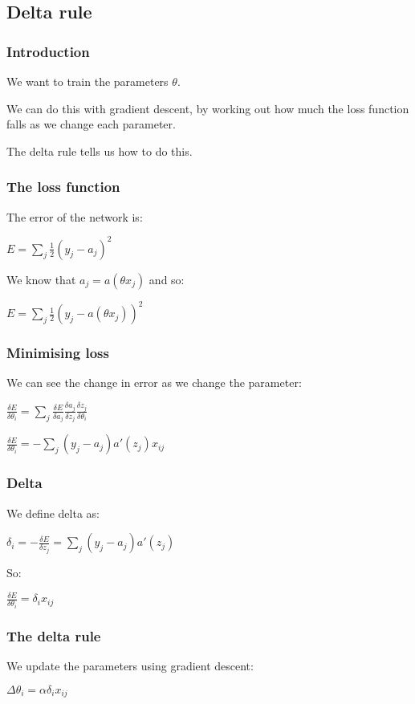 
\subsection{Delta rule}

\subsubsection{Introduction}

We want to train the parameters \(\theta \).

We can do this with gradient descent, by working out how much the loss function falls as we change each parameter.

The delta rule tells us how to do this.

\subsubsection{The loss function}

The error of the network is:

\(E=\sum_j\frac{1}{2}(y_j-a_j)^2\)

We know that \(a_j=a(\theta x_j)\) and so:

\(E=\sum_j\frac{1}{2}(y_j-a(\theta x_j))^2\)

\subsubsection{Minimising loss}

We can see the change in error as we change the parameter:

\(\frac{\delta E}{\delta \theta_i }=\sum_j \frac{\delta E}{\delta a_j}\frac{\delta a_j}{\delta z_j}\frac{\delta z_j}{\delta \theta_i}\)

\(\frac{\delta E}{\delta \theta_i }=-\sum_j(y_j-a_j)a'(z_j)x_{ij}\)

\subsubsection{Delta}

We define delta as:

\(\delta_i=-\frac{\delta E}{\delta z_j}=\sum_j(y_j-a_j)a'(z_j)\)

So:

\(\frac{\delta E}{\delta \theta_i }=\delta_i x_{ij}\)

\subsubsection{The delta rule}

We update the parameters using gradient descent:

\(\Delta \theta_i=\alpha \delta_i x_{ij}\)

